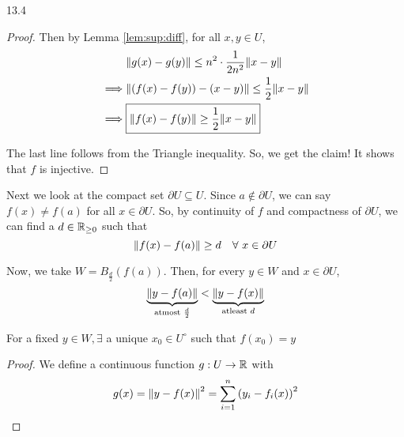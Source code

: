 \documentclass[../Analysis-3.tex]{subfiles}
\begin{document}
\begin{proofFig}{}{}{\label{fig:inf:fun}}{13}{.4\textwidth}
\begin{proof}
    Then by Lemma \ref{lem:sup:diff}, for all $ x, y \in U $,
    \begin{align}
               & \norm{g(x)-g(y)} \leq n^2\cdot\frac{1}{2n^2}\norm{x-y} \nonumber                          \\
      \implies & \norm{(f(x)-f(y)) - (x-y)} \leq \frac{1}{2}\norm{x-y}  \nonumber                          \\
      \implies & \boxed{\norm{f(x)-f(y)} \geq \frac{1}{2}\norm{x-y}} \label{eqn:clm:normdiff:ge:th:14.2.1}
    \end{align}

    The last line follows from the Triangle inequality. So, we get the claim! It shows that $ f $ is injective.
  \end{proof}

  Next we look at the compact set $ \partial U \subseteq U $. Since $ a \not\in \partial U $, we can say $ f(x) \not= f(a) $ for all $ x \in \partial U $. So, by continuity of $ f $ and compactness of $ \partial U $,  we can find a $ d \in \mathbb{R}_{\geq 0} $ such that
  \[  \norm{f(x)-f(a)} \geq d \quad \forall\ x \in \partial U \]

  \begin{figure}[h]
    \centering
    \caption{}
    \label{fig:boundaryU_invfun}
  \end{figure}

  Now, we take $ W = B_{\frac{d}{2}}\left( f(a) \right) $. Then, for every $ y \in W $ and $ x \in \partial U $,
  \begin{equation}\label{eqn:normdist:ytofa:ytofx:th:14.2.1}
    \underbrace{\norm{y-f(a)}}_{\text{atmost } \frac{d}{2}} < \underbrace{\norm{y-f(x)}}_{\text{atleast } d}
  \end{equation}


  \begin{clmBox}
    For a fixed $ y \in W, \exists$ a unique $ x_0 \in U^{\circ} $ such that $ f(x_0) = y $
  \end{clmBox}

  \begin{proof}
    We define a continuous function $ g:U \to \mathbb{R} $ with \[ g(x) = \norm{y-f(x)}^2 = \sum_{i=1}^{n}\left( y_i - f_i(x) \right)^2 \]


\end{proof}
\end{proofFig}
\end{document}
